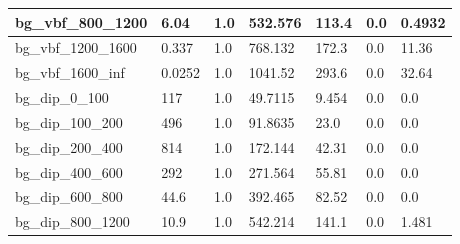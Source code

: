 \documentclass[a4paper, 10pt]{article}
\begin{document}
\begin{table}[H]
\begin{center}
\begin{tabular}{|m{23.0mm}|m{23.0mm}|m{18.0mm}|m{19.0mm}|m{19.0mm}|m{19.0mm}|m{19.0mm}|}
      \hline
      {\cellcolor{white}         bg\_vbf\_800\_1200}& {\cellcolor{white}         6.04}& {\cellcolor{white}         1.0}& {\cellcolor{white}         532.576}& {\cellcolor{white}         113.4}& {\cellcolor{green}         0.0}& {\cellcolor{green}         0.4932}\\
      \hline
      {\cellcolor{white}         bg\_vbf\_1200\_1600}& {\cellcolor{white}         0.337}& {\cellcolor{white}         1.0}& {\cellcolor{white}         768.132}& {\cellcolor{white}         172.3}& {\cellcolor{orange}         0.0}& {\cellcolor{orange}         11.36}\\
      \hline
      {\cellcolor{white}         bg\_vbf\_1600\_inf}& {\cellcolor{white}         0.0252}& {\cellcolor{white}         1.0}& {\cellcolor{white}         1041.52}& {\cellcolor{white}         293.6}& {\cellcolor{red}         0.0}& {\cellcolor{red}         32.64}\\
      \hline
      {\cellcolor{white}         bg\_dip\_0\_100}& {\cellcolor{white}         117}& {\cellcolor{white}         1.0}& {\cellcolor{white}         49.7115}& {\cellcolor{white}         9.454}& {\cellcolor{green}         0.0}& {\cellcolor{green}         0.0}\\
      \hline
      {\cellcolor{white}         bg\_dip\_100\_200}& {\cellcolor{white}         496}& {\cellcolor{white}         1.0}& {\cellcolor{white}         91.8635}& {\cellcolor{white}         23.0}& {\cellcolor{green}         0.0}& {\cellcolor{green}         0.0}\\
      \hline
      {\cellcolor{white}         bg\_dip\_200\_400}& {\cellcolor{white}         814}& {\cellcolor{white}         1.0}& {\cellcolor{white}         172.144}& {\cellcolor{white}         42.31}& {\cellcolor{green}         0.0}& {\cellcolor{green}         0.0}\\
      \hline
      {\cellcolor{white}         bg\_dip\_400\_600}& {\cellcolor{white}         292}& {\cellcolor{white}         1.0}& {\cellcolor{white}         271.564}& {\cellcolor{white}         55.81}& {\cellcolor{green}         0.0}& {\cellcolor{green}         0.0}\\
      \hline
      {\cellcolor{white}         bg\_dip\_600\_800}& {\cellcolor{white}         44.6}& {\cellcolor{white}         1.0}& {\cellcolor{white}         392.465}& {\cellcolor{white}         82.52}& {\cellcolor{green}         0.0}& {\cellcolor{green}         0.0}\\
      \hline
      {\cellcolor{white}         bg\_dip\_800\_1200}& {\cellcolor{white}         10.9}& {\cellcolor{white}         1.0}& {\cellcolor{white}         542.214}& {\cellcolor{white}         141.1}& {\cellcolor{green}         0.0}& {\cellcolor{green}         1.481}\\

\end{tabular}
\end{center}
\end{table}
\end{document}
